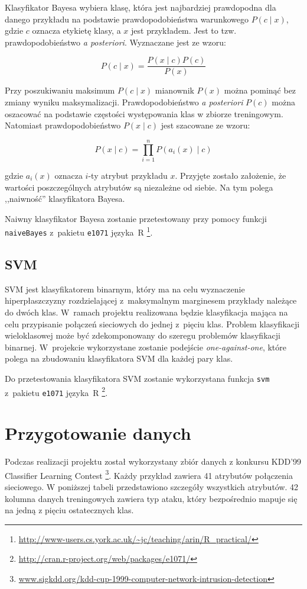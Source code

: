 \documentclass[a4paper, 12pt]{article}
\begin{document}
Klasyfikator Bayesa wybiera klasę, która jest najbardziej prawdopodna dla danego przykładu na 
podstawie prawdopodobieństwa
warunkowego $P(c \mid x)$, gdzie $c$ oznacza etykietę klasy, a $x$ jest przykładem. 
Jest to tzw. prawdopodobieństwo
\textit{a posteriori}. Wyznaczane jest ze wzoru:

$$ P(c \mid x) = \frac{P(x \mid c)P(c)}{P(x)} $$

Przy poszukiwaniu maksimum $P(c \mid x)$ mianownik $P(x)$ można pominąć bez zmiany wyniku 
maksymalizacji.
Prawdopodobieństwo \textit{a posteriori} $P(c)$ można oszacować na podstawie częstości 
występowania klas w zbiorze treningowym.
Natomiast prawdopodobieństwo $P(x \mid c)$ jest szacowane ze wzoru:

$$ P(x \mid c) = \prod_{i=1}^n P(a_i(x) \mid c)$$

gdzie $a_i(x)$ oznacza $i$-ty atrybut przykładu $x$.
Przyjęte zostało założenie, że wartości poszczególnych atrybutów są niezależne od siebie.
Na tym polega ,,naiwność'' klasyfikatora Bayesa.

Naiwny klasyfikator Bayesa zostanie przetestowany przy pomocy funkcji \texttt{naiveBayes} z~pakietu \texttt{e1071} języka~R
\footnote{\url{http://www-users.cs.york.ac.uk/~jc/teaching/arin/R_practical/}}.

\subsection{SVM}
SVM jest klasyfikatorem binarnym, który ma na celu wyznaczenie hiperpłaszczyzny rozdzielającej 
z~maksymalnym marginesem przykłady należące do dwóch klas. W~ramach projektu realizowana będzie 
klasyfikacja mająca na celu przypisanie połączeń sieciowych do jednej z~pięciu klas. 
Problem klasyfikacji wieloklasowej może być zdekomponowany do szeregu problemów klasyfikacji binarnej. 
W~projekcie wykorzystane zostanie podejście \textit{one-against-one}, 
które polega na zbudowaniu klasyfikatora SVM dla każdej pary klas. 

Do przetestowania klasyfikatora SVM zostanie wykorzystana funkcja \texttt{svm} z~pakietu 
\texttt{e1071} języka~R \footnote{\url{http://cran.r-project.org/web/packages/e1071/}}.

\section{Przygotowanie danych}

Podczas realizacji projektu został wykorzystany zbiór danych z konkursu 
KDD'99 Classifier Learning Contest
\footnote{\url{www.sigkdd.org/kdd-cup-1999-computer-network-intrusion-detection}}.
Każdy przykład zawiera 41 atrybutów połączenia sieciowego. W poniższej tabeli przedstawiono
szczegóły wszystkich atrybutów.
42 kolumna danych treningowych zawiera typ ataku, który bezpośrednio mapuje się na
jedną z pięciu ostatecznych klas. \\
\end{document}
